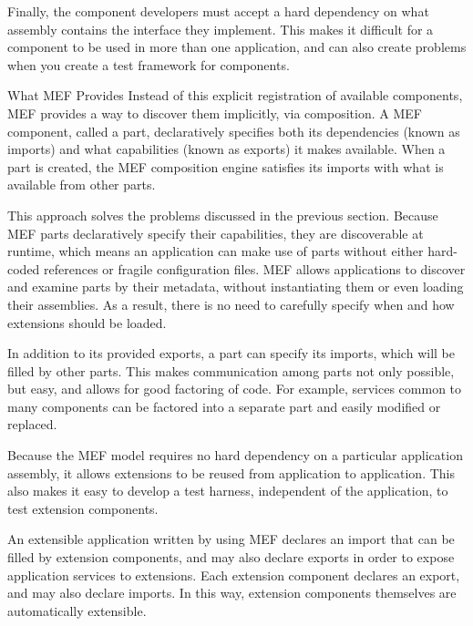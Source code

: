 Finally, the component developers must accept a hard dependency on what assembly contains the interface they implement. This makes it difficult for a component to be used in more than one application, and can also create problems when you create a test framework for components.

What MEF Provides
Instead of this explicit registration of available components, MEF provides a way to discover them implicitly, via composition. A MEF component, called a part, declaratively specifies both its dependencies (known as imports) and what capabilities (known as exports) it makes available. When a part is created, the MEF composition engine satisfies its imports with what is available from other parts.

This approach solves the problems discussed in the previous section. Because MEF parts declaratively specify their capabilities, they are discoverable at runtime, which means an application can make use of parts without either hard-coded references or fragile configuration files. MEF allows applications to discover and examine parts by their metadata, without instantiating them or even loading their assemblies. As a result, there is no need to carefully specify when and how extensions should be loaded.

In addition to its provided exports, a part can specify its imports, which will be filled by other parts. This makes communication among parts not only possible, but easy, and allows for good factoring of code. For example, services common to many components can be factored into a separate part and easily modified or replaced.

Because the MEF model requires no hard dependency on a particular application assembly, it allows extensions to be reused from application to application. This also makes it easy to develop a test harness, independent of the application, to test extension components.

An extensible application written by using MEF declares an import that can be filled by extension components, and may also declare exports in order to expose application services to extensions. Each extension component declares an export, and may also declare imports. In this way, extension components themselves are automatically extensible.